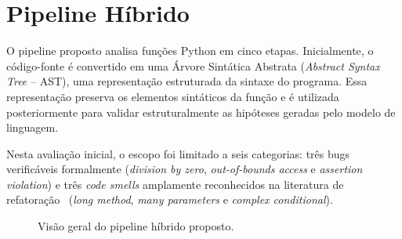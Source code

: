 \documentclass[sigconf]{acmart}
\begin{document}
\section{Pipeline Híbrido}

O pipeline proposto analisa funções Python em cinco etapas.
Inicialmente, o código-fonte é convertido em uma Árvore Sintática
Abstrata (\textit{Abstract Syntax Tree} -- AST), uma representação
estruturada da sintaxe do programa. Essa representação preserva os
elementos sintáticos da função e é utilizada posteriormente para validar
estruturalmente as hipóteses geradas pelo modelo de linguagem.

Nesta avaliação inicial, o escopo foi limitado a seis categorias: três
bugs verificáveis formalmente (\textit{division by zero},
\textit{out-of-bounds access} e \textit{assertion violation}) e três
\textit{code smells} amplamente reconhecidos na literatura de
refatoração~\cite{fowler1999refactoring} (\textit{long method},
\textit{many parameters} e \textit{complex conditional}).

\begin{figure}[htb]
  \centering
  \caption{Visão geral do pipeline híbrido proposto.}
  \label{fig:pipeline}
\end{figure}
\end{document}
